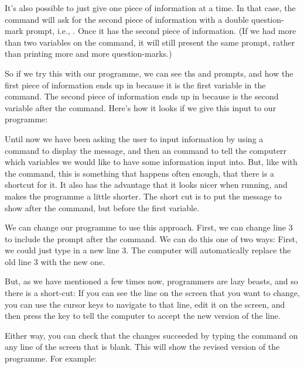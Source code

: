 It's also possible to just give one piece of information at a time.
In that case, the  command will ask for the second piece
of information with a double question-mark prompt, i.e., .
Once it has the second piece of information.  (If we had more than
two variables on the  command, it will still present the
same  prompt, rather than printing more and more
question-marks.)

\needspace{4cm}
So if we try this with our programme, we can see ths  and
 prompts, and how the first piece of information ends up in
 because it is the first variable in the 
command.
The second piece of information ends up in  because  is
the second variable after the  command. Here's how it
looks if we give this input to our programme:



Until now we have been asking the user to input information by using a
 command to display the message, and then an 
command to tell the computerr which variables we would like to have
some information input into.  But, like with the  command,
this is something that happens often enough, that there is a shortcut
for it. It also has the advantage that it looks nicer when
running, and makes the programme a little shorter. The short cut is to
put the message to show after the  command, but before the
first variable.

We can change our programme to use this approach.  First, we can
change line 3 to include the prompt after the  command.  We
can do this one of two ways: First, we could just type in a new line
3. The computer will automatically replace the old line 3 with the new
one.

But, as we have mentioned a few times now, programmers are lazy
beasts, and so there is a short-cut: If you can see the line on the
screen that you want to change, you can use the cursor keys to
navigate to that line, edit it on the screen, and then press the
 key to tell the computer to accept the new version
of the line.

\needspace{4cm}
Either way, you
can check that the changes succeeded by typing the  command
on any line of the screen that is blank.  This will show the revised
version of the programme.  For example:

